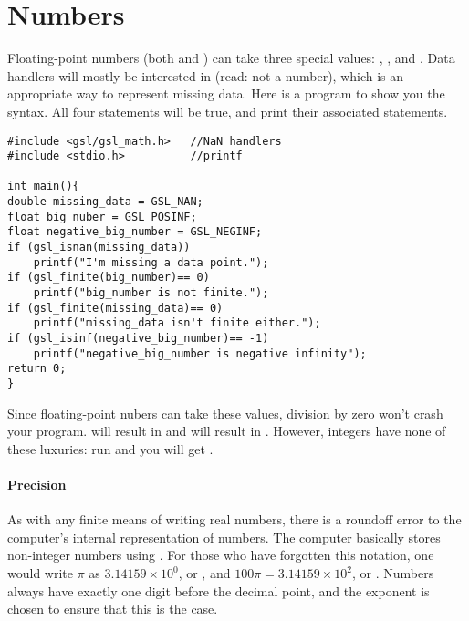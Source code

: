 \section{\treesymbol Numbers}       \label{numbers}
Floating-point numbers (both  and ) can take three special values: , , and . Data handlers will mostly be
interested in  (read: not a number), which is an appropriate way to represent missing data. Here is a
program to show you the syntax. All four  statements will be true, and print their associated
statements.
\begin{lstlisting}
#include <gsl/gsl_math.h>   //NaN handlers
#include <stdio.h>          //printf

int main(){
double missing_data = GSL_NAN;
float big_nuber = GSL_POSINF;
float negative_big_number = GSL_NEGINF;
if (gsl_isnan(missing_data))
    printf("I'm missing a data point.");
if (gsl_finite(big_number)== 0)
    printf("big_number is not finite.");
if (gsl_finite(missing_data)== 0)
    printf("missing_data isn't finite either.");
if (gsl_isinf(negative_big_number)== -1)
    printf("negative_big_number is negative infinity");
return 0;
}
\end{lstlisting}

Since floating-point nubers can take these values, division by zero
won't crash your program.  will result in
 and  will result in . However, integers have none of these luxuries: run  and you will get .

\paragraph{Precision} 
As with any finite means of writing real numbers,
there is a roundoff error to the computer's internal representation of
numbers. The computer basically stores non-integer numbers using
. For those who have forgotten this notation, one
would write  $\pi$ as $3.14159 \times 10^0$, or , 
and $100\pi = 3.14159 \times 10^2$, or . 
Numbers always have exactly one digit before the decimal point, and the
exponent is chosen to ensure that this is the case.


